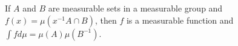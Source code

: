 If $A$ and $B$ are measurable sets in a measurable group and $f(x) = \mu(x^{-1}A \cap B)$, then $f$ is a measurable function and $\int f d\mu = \mu(A)\mu(B^{-1})$.
